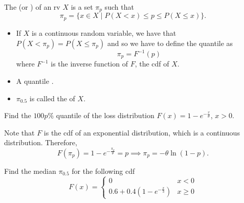 \documentclass[notoc,notitlepage]{tufte-book}
\begin{document}
\begin{defn}[Quantiles]\label{defn:quantiles}
  The  (or ) of an rv $X$ is a set $\pi_p$ such that
  \begin{equation*}
    \pi_p = \{ x \in X \mid P(X < x) \leq p \leq P(X \leq x) \}.
  \end{equation*}
\end{defn}

\begin{note}
  \begin{itemize}
    \item If $X$ is a continuous random variable, we have that $P(X < \pi_p) = P(X \leq \pi_p)$ and so we have to define the quantile as
      \begin{equation*}
        \pi_p = F^{-1} (p)
      \end{equation*}
      where $F^{-1}$ is the inverse function of $F$, the cdf of $X$.

    \item A quantile .
    \item $\pi_{0.5}$ is called the  of $X$.
  \end{itemize}
\end{note}


\begin{eg}
  Find the $100p\%$ quantile of the loss distribution $F(x) = 1 - e^{-\frac{x}{\theta}}$, $x > 0$.
\end{eg}

\begin{solution}
  Note that $F$ is the cdf of an exponential distribution, which is a continuous distribution. Therefore,
  \begin{equation*}
    F(\pi_p) = 1 - e^{-\frac{\pi_p}{\theta}} = p \implies \pi_p = - \theta \ln (1 - p).
  \end{equation*}
\end{solution}

\begin{eg}
  Find the median $\pi_{0.5}$ for the following cdf
  \begin{equation*}
    F(x) = \begin{cases}
      0                                & x < 0 \\
      0.6 + 0.4 (1 - e^{-\frac{x}{3}}) & x \geq 0
    \end{cases}
  \end{equation*}
\end{eg}
\end{document}
